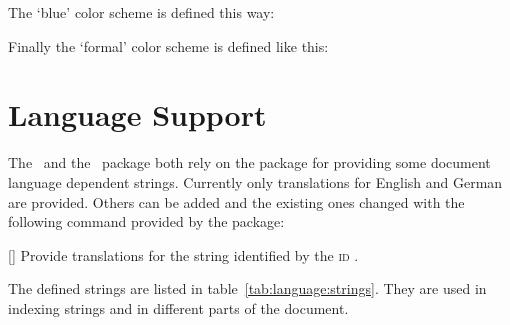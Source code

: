 \documentclass[load-preamble]{cnltx-doc}
\begin{document}
The `blue' color scheme is defined this way:
\begin{sourcecode}
\end{sourcecode}

Finally the `formal' color scheme is defined like this:
\begin{sourcecode}
\end{sourcecode}

\section{Language Support}

\noindent{}The \cnltxdoc\ and the \cnltxexample\ package both
rely on the  package for providing some document language
dependent strings.  Currently only translations for English and German are
provided.  Others can be added and the existing ones changed with the
following command provided by the  package:

\begin{commands}
  []
    Provide translations for the string identified by the \textsc{id}
    .
\end{commands}

The defined strings are listed in table~\ref{tab:language:strings}.  They are
used in indexing strings and in different parts of the document.
\end{document}
